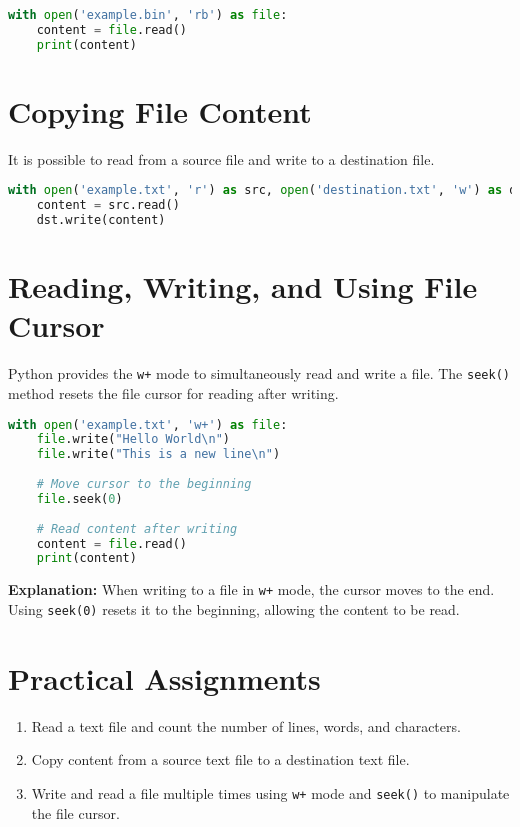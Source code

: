 \begin{lstlisting}[language=Python]
with open('example.bin', 'rb') as file:
    content = file.read()
    print(content)
\end{lstlisting}

\section{Copying File Content}

It is possible to read from a source file and write to a destination file.

\begin{lstlisting}[language=Python]
with open('example.txt', 'r') as src, open('destination.txt', 'w') as dst:
    content = src.read()
    dst.write(content)
\end{lstlisting}

\section{Reading, Writing, and Using File Cursor}

Python provides the \texttt{w+} mode to simultaneously read and write a file. The \texttt{seek()} method resets the file cursor for reading after writing.

\begin{lstlisting}[language=Python]
with open('example.txt', 'w+') as file:
    file.write("Hello World\n")
    file.write("This is a new line\n")
    
    # Move cursor to the beginning
    file.seek(0)
    
    # Read content after writing
    content = file.read()
    print(content)
\end{lstlisting}

\textbf{Explanation:} When writing to a file in \texttt{w+} mode, the cursor moves to the end. Using \texttt{seek(0)} resets it to the beginning, allowing the content to be read.

\section{Practical Assignments}

\begin{enumerate}
    \item Read a text file and count the number of lines, words, and characters.
    \item Copy content from a source text file to a destination text file.
    \item Write and read a file multiple times using \texttt{w+} mode and \texttt{seek()} to manipulate the file cursor.
\end{enumerate}

